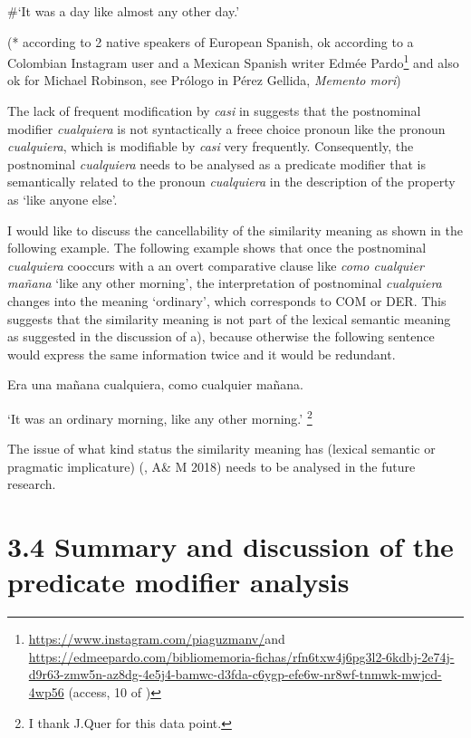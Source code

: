   \#‘It was a day like almost any other day.’

  (* according to 2 native speakers of European Spanish, ok according to a Colombian Instagram user and a Mexican Spanish writer Edmée Pardo\footnote{\url{https://www.instagram.com/piaguzmanv/}{ {and}} \url{https://edmeepardo.com/bibliomemoria-fichas/rfn6txw4j6pg3l2-6kdbj-2e74j-d9r63-zmw5n-az8dg-4e5j4-bamwc-d3fda-c6ygp-efe6w-nr8wf-tnmwk-mwjcd-4wp56} {(access, 10 of \citealt{November2023})}} and also ok for Michael Robinson, see Prólogo in Pérez Gellida, \textit{Memento mori})

The lack of frequent modification by \textit{casi} in  suggests that the postnominal modifier \textit{cualquiera} is not syntactically a freee choice pronoun like the pronoun \textit{cualquiera}, which is modifiable by \textit{casi} very frequently. Consequently, the postnominal \textit{cualquiera} needs to be analysed as a predicate modifier that is semantically related to the pronoun \textit{cualquiera} in the description of the property as ‘like anyone else’.

  I would like to discuss the cancellability of the similarity meaning as shown in the following example. The following example shows that once the postnominal \textit{cualquiera} cooccurs with a an overt comparative clause like \textit{como cualquier mañana} ‘like any other morning’, the interpretation of postnominal \textit{cualquiera} changes into the meaning ‘ordinary’, which corresponds to COM or DER. This suggests that the similarity meaning is not part of the lexical semantic meaning as suggested in the discussion of a), because otherwise the following sentence would express the same information twice and it would be redundant.   

  Era una mañana cualquiera, como cualquier mañana. 

‘It was an ordinary morning, like any other morning.’ \footnote{{I thank J.Quer for this data point.} }

The issue of what kind status the similarity meaning has (lexical semantic or pragmatic implicature) (\citealt{Aloni2021}, A\& M 2018) needs to be analysed in the future research.

\section{\textbf{3.4} \textbf{Summary} \textbf{and} \textbf{discussion} \textbf{of} \textbf{the} \textbf{predicate} \textbf{modifier} \textbf{analysis}}

